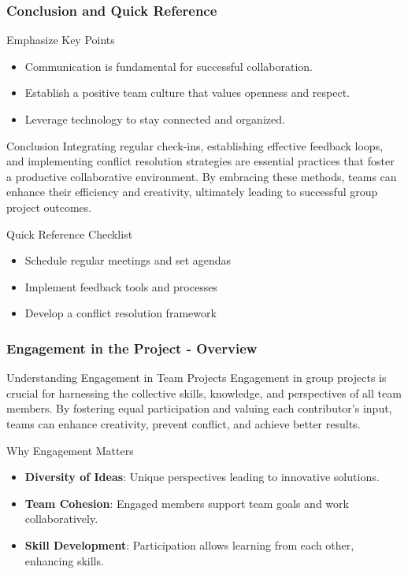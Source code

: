 \documentclass[aspectratio=169]{beamer}
\begin{document}
\begin{frame}[fragile]
    \frametitle{Conclusion and Quick Reference}
    \begin{block}{Emphasize Key Points}
        \begin{itemize}
            \item Communication is fundamental for successful collaboration.
            \item Establish a positive team culture that values openness and respect.
            \item Leverage technology to stay connected and organized.
        \end{itemize}
    \end{block}
    
    \begin{block}{Conclusion}
        Integrating regular check-ins, establishing effective feedback loops, and implementing conflict resolution strategies are essential practices that foster a productive collaborative environment. By embracing these methods, teams can enhance their efficiency and creativity, ultimately leading to successful group project outcomes.
    \end{block}
    
    \begin{block}{Quick Reference Checklist}
        \begin{itemize}
            \item [ ] Schedule regular meetings and set agendas
            \item [ ] Implement feedback tools and processes
            \item [ ] Develop a conflict resolution framework
        \end{itemize}
    \end{block}
\end{frame}

\begin{frame}[fragile]
    \frametitle{Engagement in the Project - Overview}
    \begin{block}{Understanding Engagement in Team Projects}
        Engagement in group projects is crucial for harnessing the collective skills, knowledge, and perspectives of all team members. By fostering equal participation and valuing each contributor’s input, teams can enhance creativity, prevent conflict, and achieve better results.
    \end{block}
    
    \begin{block}{Why Engagement Matters}
        \begin{itemize}
            \item \textbf{Diversity of Ideas}: Unique perspectives leading to innovative solutions.
            \item \textbf{Team Cohesion}: Engaged members support team goals and work collaboratively.
            \item \textbf{Skill Development}: Participation allows learning from each other, enhancing skills.
        \end{itemize}
    \end{block}
\end{frame}
\end{document}
